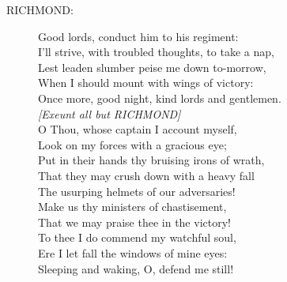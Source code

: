 \documentclass{article}
\begin{document}
\begin{description}
\item[RICHMOND:] 
\hspace{1pt}Good lords, conduct him to his regiment:\\
\hspace{1pt}I'll strive, with troubled thoughts, to take a nap,\\
\hspace{1pt}Lest leaden slumber peise me down to-morrow,\\
\hspace{1pt}When I should mount with wings of victory:\\
\hspace{1pt}Once more, good night, kind lords and gentlemen.\\
{\it [Exeunt all but RICHMOND]}\\
\hspace{1pt}O Thou, whose captain I account myself,\\
\hspace{1pt}Look on my forces with a gracious eye;\\
\hspace{1pt}Put in their hands thy bruising irons of wrath,\\
\hspace{1pt}That they may crush down with a heavy fall\\
\hspace{1pt}The usurping helmets of our adversaries!\\
\hspace{1pt}Make us thy ministers of chastisement,\\
\hspace{1pt}That we may praise thee in the victory!\\
\hspace{1pt}To thee I do commend my watchful soul,\\
\hspace{1pt}Ere I let fall the windows of mine eyes:\\
\hspace{1pt}Sleeping and waking, O, defend me still!\\
\end{description}
\centering{\it [Sleeps]}\\
\\
\end{document}
